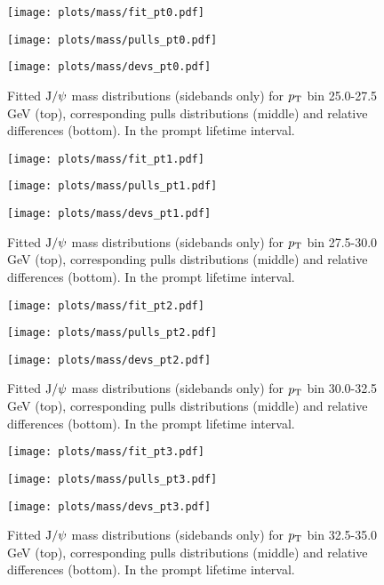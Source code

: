 \begin{figure}[h!]
\centering
\texttt{[image: plots/mass/fit\_pt0.pdf]}

\texttt{[image: plots/mass/pulls\_pt0.pdf]}

\texttt{[image: plots/mass/devs\_pt0.pdf]}

\caption{Fitted $\text{J/}\psi$ mass distributions (sidebands only) for $p_\text{T}$ bin 25.0-27.5 GeV (top), corresponding pulls distributions (middle) and relative differences (bottom). In the prompt lifetime interval.}\label{f:m_fit_0}
\end{figure}

\pagebreak

\begin{figure}[h!]
\centering
\texttt{[image: plots/mass/fit\_pt1.pdf]}

\texttt{[image: plots/mass/pulls\_pt1.pdf]}

\texttt{[image: plots/mass/devs\_pt1.pdf]}

\caption{Fitted $\text{J/}\psi$ mass distributions (sidebands only) for $p_\text{T}$ bin 27.5-30.0 GeV (top), corresponding pulls distributions (middle) and relative differences (bottom). In the prompt lifetime interval.}\label{f:m_fit_1}
\end{figure}

\pagebreak

\begin{figure}[h!]
\centering
\texttt{[image: plots/mass/fit\_pt2.pdf]}

\texttt{[image: plots/mass/pulls\_pt2.pdf]}

\texttt{[image: plots/mass/devs\_pt2.pdf]}

\caption{Fitted $\text{J/}\psi$ mass distributions (sidebands only) for $p_\text{T}$ bin 30.0-32.5 GeV (top), corresponding pulls distributions (middle) and relative differences (bottom). In the prompt lifetime interval.}\label{f:m_fit_2}
\end{figure}

\pagebreak

\begin{figure}[h!]
\centering
\texttt{[image: plots/mass/fit\_pt3.pdf]}

\texttt{[image: plots/mass/pulls\_pt3.pdf]}

\texttt{[image: plots/mass/devs\_pt3.pdf]}

\caption{Fitted $\text{J/}\psi$ mass distributions (sidebands only) for $p_\text{T}$ bin 32.5-35.0 GeV (top), corresponding pulls distributions (middle) and relative differences (bottom). In the prompt lifetime interval.}\label{f:m_fit_3}
\end{figure}

